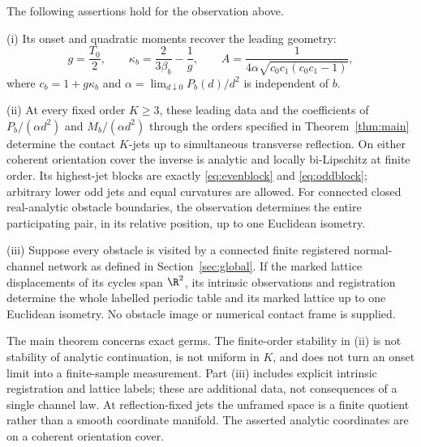 \begin{theorem}
\label{thm:intrinsic}
The following assertions hold for the observation above.

\smallskip\noindent
\textup{(i)} Its onset and quadratic moments recover the leading geometry:
\begin{equation}\label{eq:calibrationmain}
 g=\frac{T_0}{2},\qquad
 \kappa_b=\frac{2}{3\beta_b}-\frac1g,\qquad
 A=\frac1{4\alpha\sqrt{c_0c_1(c_0c_1-1)}},
\end{equation}
where $c_b=1+g\kappa_b$ and
$\alpha=\lim_{d\downarrow0}P_b(d)/d^2$ is independent of $b$.

\smallskip\noindent
\textup{(ii)} At every fixed order $K\ge3$, these leading data and the
coefficients of $P_b/(\alpha d^2)$ and $M_b/(\alpha d^2)$ through the
orders specified in Theorem~\ref{thm:main} determine the contact $K$-jets
up to simultaneous transverse reflection. On either coherent orientation
cover the inverse is analytic and locally bi-Lipschitz at finite order.
Its highest-jet blocks are exactly \eqref{eq:evenblock} and
\eqref{eq:oddblock}; arbitrary lower odd jets and equal curvatures are
allowed. For connected closed real-analytic obstacle boundaries, the
observation determines the entire participating pair, in its relative
position, up to one Euclidean isometry.

\smallskip\noindent
\textup{(iii)} Suppose every obstacle is visited by a connected finite
registered normal-channel network as defined in
Section~\ref{sec:global}. If the marked lattice displacements of its
cycles span $\R^2$, its intrinsic observations and registration determine
the whole labelled periodic table and its marked lattice up to one
Euclidean isometry. No obstacle image or numerical contact frame is
supplied.
\end{theorem}

The main theorem concerns exact germs. The finite-order stability in
(ii) is not stability of analytic continuation, is not uniform in $K$,
and does not turn an onset limit into a finite-sample measurement.
Part (iii) includes explicit intrinsic registration and lattice labels;
these are additional data, not consequences of a single channel law.
At reflection-fixed jets the unframed space is a finite quotient rather
than a smooth coordinate manifold. The asserted analytic coordinates
are on a coherent orientation cover.

